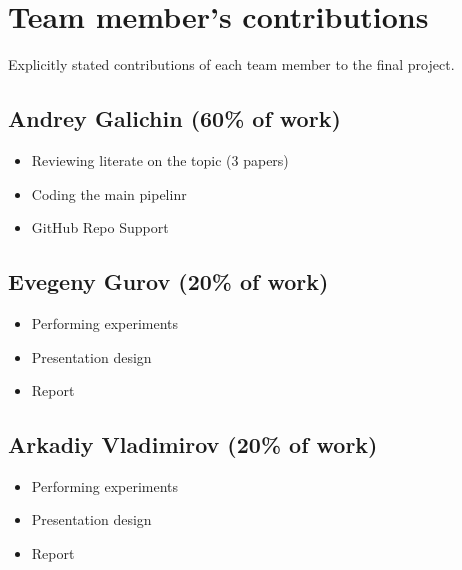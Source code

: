 \documentclass{article}
\begin{document}


\clearpage

\newpage
\appendix
\section{Team member's contributions}
\label{appendix-contrib}
Explicitly stated contributions of each team member to the final project.
\subsection*{Andrey Galichin (60\% of work)}
\begin{itemize}
    \item Reviewing literate on the topic (3 papers)
    \item Coding the main pipelinr
    \item GitHub Repo Support
\end{itemize}

\subsection*{Evegeny Gurov (20\% of work)}
\begin{itemize}
    \item Performing experiments
    \item Presentation design
    \item Report
\end{itemize}

\subsection*{Arkadiy Vladimirov (20\% of work)}
\begin{itemize}
    \item Performing experiments
    \item Presentation design
    \item Report
\end{itemize}

\clearpage
\end{document}
